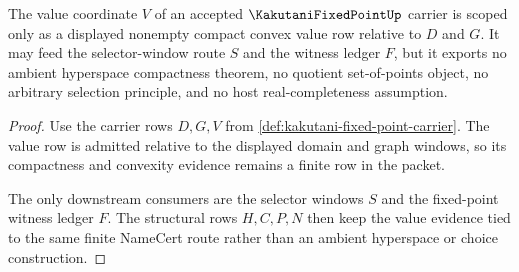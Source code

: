 \begin{theorem}\label{thm:kakutani-fixed-point-convex-compact-value-scope}
The value coordinate $V$ of an accepted $\KakutaniFixedPointUp$ carrier is scoped only as a displayed nonempty compact convex value row relative to $D$ and $G$. It may feed the selector-window route $S$ and the witness ledger $F$, but it exports no ambient hyperspace compactness theorem, no quotient set-of-points object, no arbitrary selection principle, and no host real-completeness assumption.
\end{theorem}
\begin{proof}
Use the carrier rows $D,G,V$ from \autoref{def:kakutani-fixed-point-carrier}. The value row is admitted relative to the displayed domain and graph windows, so its compactness and convexity evidence remains a finite row in the packet.

The only downstream consumers are the selector windows $S$ and the fixed-point witness ledger $F$. The structural rows $H,C,P,N$ then keep the value evidence tied to the same finite NameCert route rather than an ambient hyperspace or choice construction.
\end{proof}

